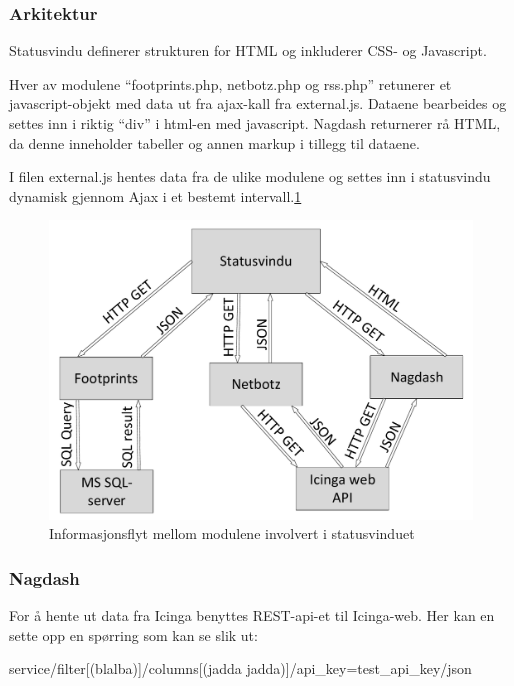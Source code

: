 \subsubsection{Arkitektur}

Statusvindu definerer strukturen for HTML og inkluderer CSS- og Javascript.

Hver av modulene “footprints.php, netbotz.php og rss.php” retunerer et javascript-objekt med data ut fra ajax-kall fra external.js. Dataene bearbeides og settes inn i riktig “div” i html-en med javascript. Nagdash returnerer rå HTML, da denne inneholder tabeller og annen markup i tillegg til dataene.

I filen external.js hentes data fra de ulike modulene og settes inn i statusvindu dynamisk gjennom Ajax i et bestemt intervall.\ref{statusvindu_arkitektur}

\begin{figure}[H]
    \centering
    \includegraphics[scale=0.6]{img/statusvindu_arkitektur}
    \caption{Informasjonsflyt mellom modulene involvert i statusvinduet}
    \label{statusvindu_arkitektur}
\end{figure}


\subsubsection{Nagdash}

For å hente ut data fra Icinga benyttes REST-api-et til Icinga-web. Her kan en sette opp en spørring som kan se slik ut:

service/filter[(blalba)]/columns[(jadda jadda)]/api\_key=test\_api\_key/json

